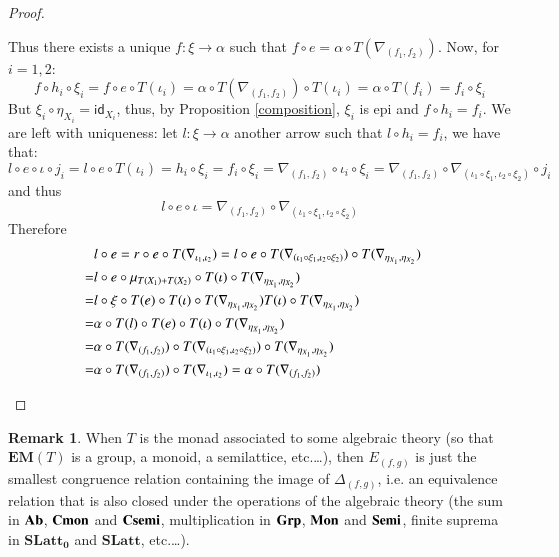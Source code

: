 \documentclass[12pt]{article}
\theoremstyle{definition}
\newtheorem{remark}[lemma]{Remark}
\newcommand{\Ab}{\textbf{\textup{Ab}}}
\newcommand{\Grp}{\textbf{\textup{Grp}}}
\newcommand{\Mon}{\textbf{\textup{Mon}}}
\newcommand{\Cmon}{\textbf{\textup{Cmon}}}
\newcommand{\Semi}{\textbf{\textup{Semi}}}
\newcommand{\Csemi}{\textbf{\textup{Csemi}}}
\newcommand{\SLatt}{\mathbf{SLatt_0}}
\newcommand{\SLattnobottom}{\mathbf{SLatt}}
\newcommand{\eim}[1]{\mathbf{EM}{(#1)}}
\numberwithin{equation}{section}
\newcommand{\id}[1]{\mathsf{id}_{#1}}
\begin{document}
\begin{proof}
\begin{itemize}
Thus there exists  a unique $f:\xi\rightarrow \alpha$ such that $f\circ e=\alpha\circ T(\nabla_{(f_1,f_2)})$. Now, for $i=1,2$:
\[f\circ h_i\circ \xi_i=f\circ e\circ T(\iota_i)=\alpha\circ  T(\nabla_{(f_1,f_2)})\circ T(\iota_i)=\alpha \circ T(f_i)=f_i\circ \xi_i \]
But $\xi_i\circ \eta_{X_i}=\id{X_i}$, thus, by Proposition \ref{composition}, $\xi_i$ is epi and $f\circ h_i=f_i$. We are left with uniqueness: let $l:\xi\rightarrow \alpha$ another arrow such that $l\circ h_i=f_i$, we have that:
\[l\circ e\circ \iota \circ j_i= l\circ e \circ T(\iota_i)= h_i\circ \xi_i=f_i\circ \xi_i=\nabla_{(f_1, f_2)}\circ \iota_i\circ\xi_i=\nabla_{(f_1, f_2)}\circ \nabla_{(\iota_1\circ \xi_1, \iota_2\circ \xi_2)}\circ j_i\]
and thus \[l\circ e\circ \iota=\nabla_{(f_1, f_2)}\circ \nabla_{(\iota_1\circ \xi_1, \iota_2\circ \xi_2)}\]
Therefore
\begin{align*}
&l\circ e=r\circ e \circ T(\nabla_{\iota_1, \iota_2})=l\circ e\circ T(\nabla_{(\iota_1\circ \xi_1, \iota_2\circ \xi_2)})\circ T(\nabla_{\eta_{X_1},\eta_{X_2}})\\=&l \circ e \circ \mu_{T(X_1)+T(X_2)}\circ T(\iota)\circ T(\nabla_{\eta_{X_1},\eta_{X_2}})\\=&l\circ \xi\circ T(e) \circ T(\iota)\circ T(\nabla_{\eta_{X_1},\eta_{X_2}})T(\iota)\circ T(\nabla_{\eta_{X_1},\eta_{X_2}})\\=&\alpha \circ T(l)\circ T(e) \circ T(\iota)\circ T(\nabla_{\eta_{X_1},\eta_{X_2}})\\=&
\alpha \circ T(\nabla_{(f_1, f_2)})\circ T(\nabla_{(\iota_1\circ \xi_1, \iota_2\circ \xi_2)})\circ T(\nabla_{\eta_{X_1},\eta_{X_2}})\\=&\alpha \circ T(\nabla_{(f_1, f_2)})\circ T(\nabla_{\iota_1, \iota_2})=\alpha \circ T(\nabla_{(f_1, f_2)})
&\qedhere 
\end{align*}
	     
	        
	\end{itemize}
\end{proof} 

\begin{remark} When $T$ is the monad associated to some algebraic theory (so that $\eim{T}$ is a group, a monoid, a semilattice, etc.\dots), then $E_{(f,g)}$ is just the smallest congruence relation containing the image of $\Delta_{(f,g)}$, i.e. an equivalence relation that is also closed under the operations of the algebraic theory (the sum in $\Ab$, $\Cmon$ and $\Csemi$, multiplication in $\Grp$, $\Mon$ and $\Semi$, finite suprema in $\SLatt$ and $\SLattnobottom$, etc.\dots).
\end{remark}
\end{document}
